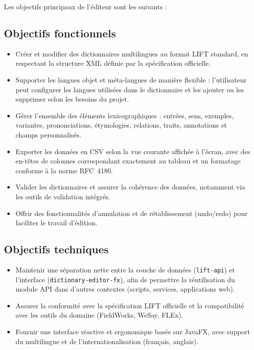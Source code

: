 \documentclass[11pt,twoside,openany]{book}
\begin{document}
Les objectifs principaux de l'éditeur sont les suivants :

\subsection{Objectifs fonctionnels}

\begin{itemize}
\item Créer et modifier des dictionnaires multilingues au format LIFT standard, en respectant la structure XML définie par la spécification officielle.
\item Supporter les langues objet et méta-langues de manière flexible : l'utilisateur peut configurer les langues utilisées dans le dictionnaire et les ajouter ou les supprimer selon les besoins du projet.
\item Gérer l'ensemble des éléments lexicographiques : entrées, sens, exemples, variantes, prononciations, étymologies, relations, traits, annotations et champs personnalisés.
\item Exporter les données en CSV selon la vue courante affichée à l'écran, avec des en-têtes de colonnes correspondant exactement au tableau et un formatage conforme à la norme RFC~4180.
\item Valider les dictionnaires et assurer la cohérence des données, notamment via les outils de validation intégrés.
\item Offrir des fonctionnalités d'annulation et de rétablissement (undo/redo) pour faciliter le travail d'édition.
\end{itemize}

\subsection{Objectifs techniques}

\begin{itemize}
\item Maintenir une séparation nette entre la couche de données (\texttt{lift-api}) et l'interface (\texttt{dictionary-editor-fx}), afin de permettre la réutilisation du module API dans d'autres contextes (scripts, services, applications web).
\item Assurer la conformité avec la spécification LIFT officielle et la compatibilité avec les outils du domaine (FieldWorks, WeSay, FLEx).
\item Fournir une interface réactive et ergonomique basée sur JavaFX, avec support du multilingue et de l'internationalisation (français, anglais).
\end{itemize}
\end{document}
